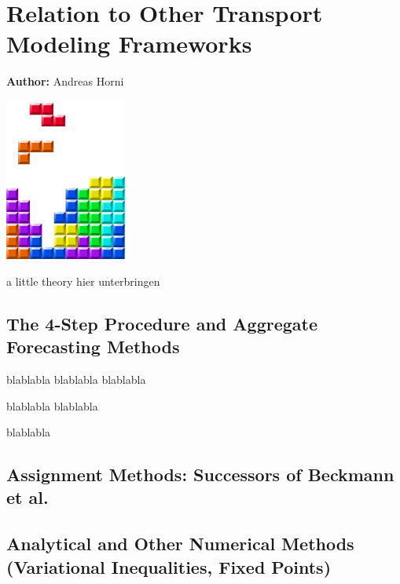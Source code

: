 \chapter{Relation to Other Transport Modeling Frameworks}
\label{ch:relation}

\hfill \textbf{Author:} Andreas Horni

\begin{center} \includegraphics[width=0.3\textwidth, angle=0]{figures/MATSimBook.png} \end{center}

a little theory hier unterbringen



\section{The 4-Step Procedure and Aggregate Forecasting Methods}
blablabla blablabla blablabla

blablabla blablabla

blablabla

\section{Assignment Methods: Successors of Beckmann et al.}

\section{Analytical and Other Numerical Methods (Variational Inequalities, Fixed Points)}

